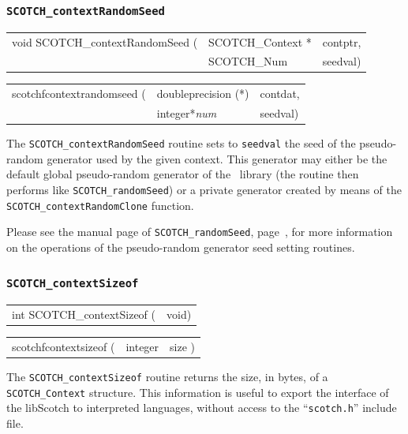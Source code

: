 \subsubsection{\texttt{SCOTCH\_contextRandomSeed}}

\begin{itemize}
\progsyn

{\tt\begin{tabular}{l@{}ll}
void SCOTCH\_contextRandomSeed ( & SCOTCH\_Context * & contptr, \\
                                 & SCOTCH\_Num       & seedval)
\end{tabular}}

{\tt\begin{tabular}{l@{}ll}
scotchfcontextrandomseed ( & doubleprecision (*) & contdat, \\
                           & integer*{\it num}   & seedval)
\end{tabular}}

\progdes

The {\tt SCOTCH\_contextRandomSeed} routine sets to \texttt{seedval}
the seed of the pseudo-random generator used by the given
context. This generator may either be the default global pseudo-random
generator of the \libscotch\ library (the routine then performs like
\texttt{SCOTCH\_\lbt random\lbt Seed}) or a private generator created
by means of the \texttt{SCOTCH\_\lbt context\lbt Random\lbt Clone}
function.

Please see the manual page of \texttt{SCOTCH\_\lbt random\lbt Seed},
page~\pageref{sec-lib-random-seed}, for more information on the
operations of the pseudo-random generator seed setting routines.
\end{itemize}

\subsubsection{{\tt SCOTCH\_contextSizeof}}

\begin{itemize}
\progsyn

{\tt\begin{tabular}{l@{}l}
int SCOTCH\_contextSizeof ( & void)
\end{tabular}}

{\tt\begin{tabular}{l@{}ll}
scotchfcontextsizeof ( & integer & size )
\end{tabular}}

\progdes

The {\tt SCOTCH\_contextSizeof} routine returns the size, in bytes, of
a {\tt SCOTCH\_\lbt Context} structure. This information is useful to
export the interface of the {\sc libScotch} to interpreted languages,
without access to the ``{\tt scotch.h}'' include file.
\end{itemize}

